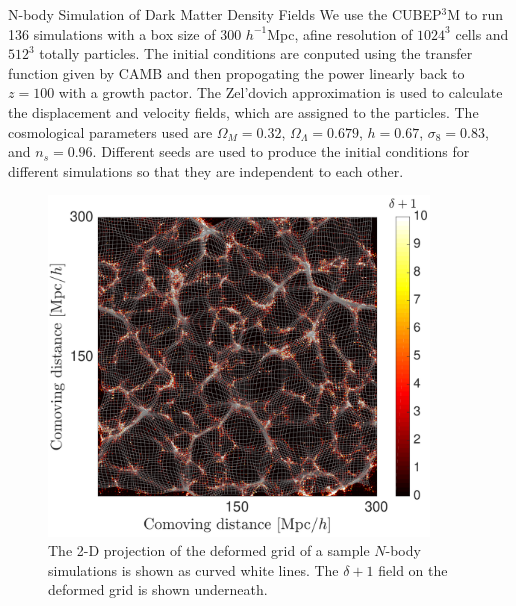 \begin{section}{N-body Simulation of Dark Matter Density Fields}
  \label{sec:simulation}
    We use the \textsc{CUBEP$^3$M} \cite{bib:Harnois2013} to 
run 136 simulations with a box size of 300 $h^{-1}$Mpc, 
afine resolution of $1024^3$ cells and $512^3$ totally particles. The initial conditions are 
conputed using the transfer function given by CAMB \cite{bib:Lewis2000} 
and then propogating the power linearly back to $z=100$ with a growth pactor. The Zel'dovich approximation 
is used to calculate the displacement and velocity fields, which are 
assigned to the particles. The cosmological parameters used are $\Omega_M=0.32$, 
$\Omega_{\Lambda}=0.679$, $h=0.67$, $\sigma_8=0.83$, and $n_s=0.96$. Different seeds are used to produce 
the initial conditions for different simulations so that they are 
independent to each other.
\begin{figure}[t!]
\centering
 \includegraphics[width=0.9\textwidth]{sar_best_analysis-crop.pdf}
   \caption{
The 2-D projection of the 
deformed grid of a sample $N$-body simulations is shown as curved white lines. The $\delta+1$ field 
on the deformed grid is shown underneath.}
 \label{fig:simandrec}
\end{figure}

\end{section}

